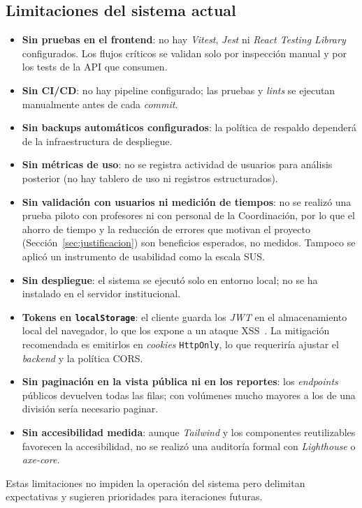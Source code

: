 \subsection{Limitaciones del sistema actual}

\begin{itemize}
    \item \textbf{Sin pruebas en el frontend}: no hay \emph{Vitest}, \emph{Jest} ni \emph{React Testing Library} configurados. Los flujos críticos se validan solo por inspección manual y por los tests de la API que consumen.
    \item \textbf{Sin CI/CD}: no hay pipeline configurado; las pruebas y \emph{lints} se ejecutan manualmente antes de cada \emph{commit}.
    \item \textbf{Sin backups automáticos configurados}: la política de respaldo dependerá de la infraestructura de despliegue.
    \item \textbf{Sin métricas de uso}: no se registra actividad de usuarios para análisis posterior (no hay tablero de uso ni registros estructurados).
    \item \textbf{Sin validación con usuarios ni medición de tiempos}: no se realizó una prueba piloto con profesores ni con personal de la Coordinación, por lo que el ahorro de tiempo y la reducción de errores que motivan el proyecto (Sección~\ref{sec:justificacion}) son beneficios esperados, no medidos. Tampoco se aplicó un instrumento de usabilidad como la escala SUS.
    \item \textbf{Sin despliegue}: el sistema se ejecutó solo en entorno local; no se ha instalado en el servidor institucional.
    \item \textbf{Tokens en \texttt{localStorage}}: el cliente guarda los \emph{JWT} en el almacenamiento local del navegador, lo que los expone a un ataque XSS~\cite{owaspHtml5}. La mitigación recomendada es emitirlos en \emph{cookies} \texttt{HttpOnly}, lo que requeriría ajustar el \emph{backend} y la política CORS.
    \item \textbf{Sin paginación en la vista pública ni en los reportes}: los \emph{endpoints} públicos devuelven todas las filas; con volúmenes mucho mayores a los de una división sería necesario paginar.
    \item \textbf{Sin accesibilidad medida}: aunque \emph{Tailwind} y los componentes reutilizables favorecen la accesibilidad, no se realizó una auditoría formal con \emph{Lighthouse} o \emph{axe-core}.
\end{itemize}

Estas limitaciones no impiden la operación del sistema pero delimitan expectativas y sugieren prioridades para iteraciones futuras.

\newpage
